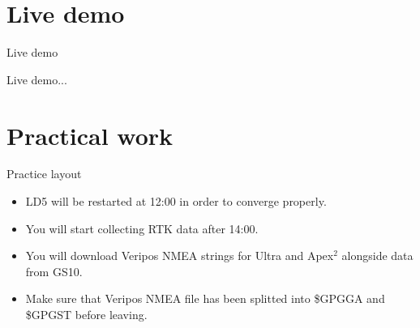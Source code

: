 \documentclass[11pt]{beamer}
\begin{document}
\section{Live demo}

\begin{frame}{Live demo}
	
\centering
{\large Live demo...}
	
\end{frame}


\section{Practical work}

\begin{frame}{Practice layout}
	
	\begin{itemize}
		\item LD5 will be restarted at 12:00 in order to converge properly.
		\item You will start collecting RTK data after 14:00. 
		\item You will download Veripos NMEA strings for Ultra and Apex$^2$ alongside data from GS10.
		\item Make sure that Veripos NMEA file has been splitted into \$GPGGA and \$GPGST before leaving.
	\end{itemize}
	

	
\end{frame}
\end{document}
